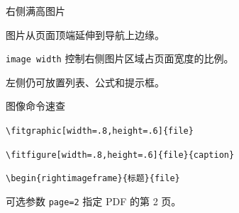 \begin{rightimageframe}[image width=\campusexamplerightimagewidth,align=\campusexamplerightimagealign]{右侧满高图片}{\campusexampleimage}
      \begin{description}[高度]
            \item[高度] 图片从页面顶端延伸到导航上边缘。
            \item[宽度] \texttt{image width} 控制右侧图片区域占页面宽度的比例。
            \item[正文] 左侧仍可放置列表、公式和提示框。
      \end{description}
\end{rightimageframe}

\begin{frame}[fragile]{图像命令速查}
      \begin{description}[适配素材]
            \item[适配素材] \verb|\fitgraphic[width=.8,height=.6]{file}|
            \item[添加图注] \verb|\fitfigure[width=.8,height=.6]{file}{caption}|
            \item[右侧图片] \verb|\begin{rightimageframe}{标题}{file}|
            \item[PDF 页面] 可选参数 \texttt{page=2} 指定 PDF 的第 2 页。
      \end{description}
\end{frame}
